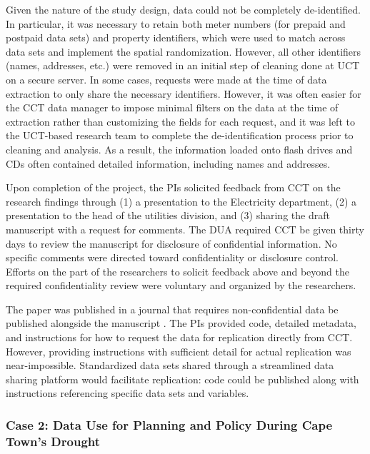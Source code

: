 Given the nature of the study design, data could not be completely de-identified. In particular, it was necessary to retain both meter numbers (for prepaid and postpaid data sets) and property identifiers, which were used to match across data sets and implement the spatial randomization. However, all other identifiers (names, addresses, etc.) were removed in an initial step of cleaning done at UCT on a secure server. In some cases, requests were made at the time of data extraction to only share the necessary identifiers. However, it was often easier for the CCT data manager to impose minimal filters on the data at the time of extraction rather than customizing the fields for each request, and it was left to the UCT-based research team to complete the de-identification process prior to cleaning and analysis. As a result, the information loaded onto flash drives and CDs often contained detailed information, including names and addresses.

Upon completion of the project, the PIs solicited feedback from CCT on the research findings through (1) a presentation to the Electricity department, (2) a presentation to the head of the utilities division, and (3) sharing the draft manuscript with a request for comments. The DUA required CCT be given thirty days to review the manuscript for disclosure of confidential information. No specific comments were directed toward confidentiality or disclosure control. Efforts on the part of the researchers to solicit feedback above and beyond the required confidentiality review were voluntary and organized by the researchers.

The paper was published in a journal that requires non-confidential data be published alongside the manuscript \citep{jack2020}. The PIs provided code, detailed metadata, and instructions for how to request the data for replication directly from CCT. However, providing instructions with sufficient detail for actual replication was near-impossible. Standardized data sets shared through a streamlined data sharing platform would facilitate replication: code could be published along with instructions referencing specific data sets and variables.

\hypertarget{case-2-data-use-for-planning-and-policy-during-cape-towns-drought}{%
\subsubsection*{Case 2: Data Use for Planning and Policy During Cape Town's Drought}\label{case-2-data-use-for-planning-and-policy-during-cape-towns-drought}}

